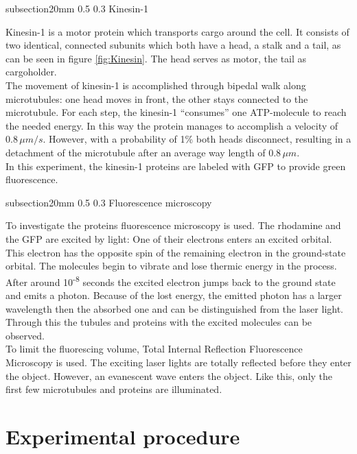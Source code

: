 \documentclass[english, %
parskip=full, %
bibliography=totoc, %
]{scrartcl}
\makeatletter
\renewcommand\subsection{\@startsection 
   {subsection}{2}{0mm}%
   {0.5\baselineskip}%
   {0.3\baselineskip}%
   {\bfseries\sffamily\large}%
   }
\makeatother
\begin{document}
\subsection{Kinesin-1}

Kinesin-1 is a motor protein which transports cargo around the cell. It consists of two identical, connected subunits which both have a head, a stalk and a tail, as can be seen in figure \ref{fig:Kinesin}. The head serves as motor, the tail as cargoholder. \\
The movement of kinesin-1 is accomplished through bipedal walk along microtubules: one head moves in front, the other stays connected to the microtubule. For each step, the kinesin-1 “consumes” one ATP-molecule to reach the needed energy. In this way the protein manages to accomplish a velocity of 0.8\,$\mu m/s$. However, with a probability of 1\% both heads disconnect, resulting in a detachment of the microtubule after an average way length of 0.8\,$\mu m$.\\
In this experiment, the kinesin-1 proteins are labeled with GFP to provide green fluorescence.

\subsection{Fluorescence microscopy}

To investigate the proteins fluorescence microscopy is used. The rhodamine and the GFP are excited by light: One of their electrons enters an excited orbital. This electron has the opposite spin of the remaining electron in the ground-state orbital. The molecules begin to vibrate and lose thermic energy in the process. After around 10\textsuperscript{-8} seconds the excited electron jumps back to the ground state and emits a photon. Because of the lost energy, the emitted photon has a larger wavelength then the absorbed one and can be distinguished from the laser light. Through this the tubules and proteins with the excited molecules can be observed.\\
To limit the fluorescing volume, Total Internal Reflection Fluorescence Microscopy is used. The exciting laser lights are totally reflected before they enter the object. However, an evanescent wave enters the object. Like this, only the first few microtubules and proteins are illuminated.

\section{Experimental procedure}
\end{document}
